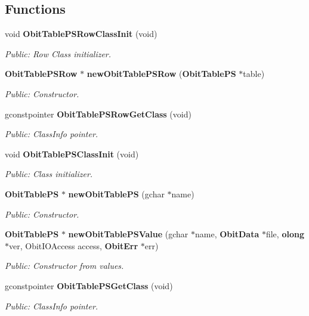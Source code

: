 \subsection*{Functions}
\begin{CompactItemize}
\item 
void {\bf Obit\-Table\-PSRow\-Class\-Init} (void)
\begin{CompactList}\small\item\em Public: Row Class initializer. \item\end{CompactList}\item 
{\bf Obit\-Table\-PSRow} $\ast$ {\bf new\-Obit\-Table\-PSRow} ({\bf Obit\-Table\-PS} $\ast$table)
\begin{CompactList}\small\item\em Public: Constructor. \item\end{CompactList}\item 
gconstpointer {\bf Obit\-Table\-PSRow\-Get\-Class} (void)
\begin{CompactList}\small\item\em Public: Class\-Info pointer. \item\end{CompactList}\item 
void {\bf Obit\-Table\-PSClass\-Init} (void)
\begin{CompactList}\small\item\em Public: Class initializer. \item\end{CompactList}\item 
{\bf Obit\-Table\-PS} $\ast$ {\bf new\-Obit\-Table\-PS} (gchar $\ast$name)
\begin{CompactList}\small\item\em Public: Constructor. \item\end{CompactList}\item 
{\bf Obit\-Table\-PS} $\ast$ {\bf new\-Obit\-Table\-PSValue} (gchar $\ast$name, {\bf Obit\-Data} $\ast$file, {\bf olong} $\ast$ver, Obit\-IOAccess access, {\bf Obit\-Err} $\ast$err)
\begin{CompactList}\small\item\em Public: Constructor from values. \item\end{CompactList}\item 
gconstpointer {\bf Obit\-Table\-PSGet\-Class} (void)
\begin{CompactList}\small\item\em Public: Class\-Info pointer. \item\end{CompactList}\item 

\end{CompactItemize}
